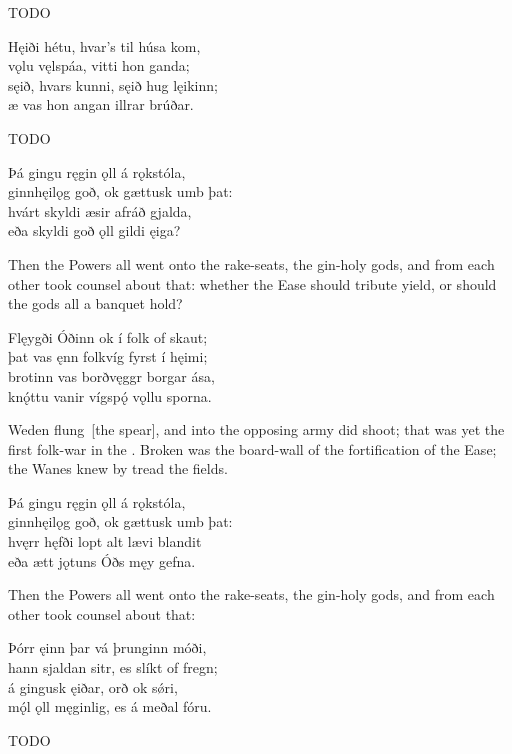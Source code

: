 \bvb TODO\evb

\bva Hęiði hétu, \hld hvar’s til húsa kom, \\%
vǫlu vęlspáa, \hld vitti hon ganda; \\%
sęið, hvars kunni, \hld sęið hug lęikinn; \\%
æ vas hon angan \hld illrar brúðar.\eva

\bvb TODO\evb

\bva Þá gingu ręgin ǫll \hld á rǫkstóla, \\%
ginnhęilǫg goð, \hld ok gættusk umb þat: \\%
hvárt skyldi æsir \hld afráð gjalda, \\%
eða skyldi goð ǫll \hld gildi ęiga?\eva

\bvb Then the Powers all went onto the rake-seats, the gin-holy gods, and from each other took counsel about that: whether the Ease should tribute yield, or should the gods all a banquet hold?\evb

\bva Flęygði Óðinn \hld ok í folk of skaut; \\%
þat vas ęnn folkvíg \hld fyrst í hęimi; \\%
brotinn vas borðvęggr \hld borgar ása, \\%
knǫ́ttu vanir vígspǫ́ \hld vǫllu sporna.\eva

\bvb Weden flung [the spear], and into the opposing army did shoot; that was yet the first folk-war in the . Broken was the board-wall of the fortification of the Ease; the Wanes knew by  tread the fields.\footnotemark[1]\evb
{}

\bva Þá gingu ręgin ǫll \hld á rǫkstóla, \\%
ginnhęilǫg goð, \hld ok gættusk umb þat: \\%
hvęrr hęfði lopt alt \hld lævi blandit \\%
eða ætt jǫtuns \hld Óðs męy gefna.\eva

\bvb Then the Powers all went onto the rake-seats, the gin-holy gods, and from each other took counsel about that:\evb

\bva Þórr ęinn þar vá \hld þrunginn móði, \\%
hann sjaldan sitr, \hld es slíkt of fregn; \\%
á gingusk ęiðar, \hld orð ok sǿri, \\%
mǫ́l ǫll męginlig, \hld es á meðal fóru.\eva

\bvb TODO\evb

